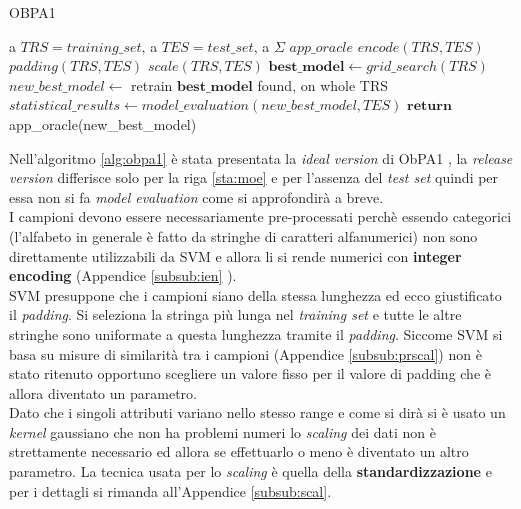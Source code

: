 \begin{algorithm}
\caption{OBPA1}\label{alg:obpa1}
\begin{algorithmic}[1]
\Statex
\Input a $TRS = training\_set$, a $TES = test\_set$, a $\Sigma$   
\Output $app\_oracle$
\State $encode(TRS , TES)$
\State $padding(TRS , TES)$
\State $scale(TRS , TES)$
\State $\textbf{best\_model} \gets grid\_search(TRS)$ \label{sta:quattro}
\State $new\_best\_model \gets$ retrain $\textbf{best\_model}$ found, on whole TRS
\State $statistical\_results \gets model\_evaluation(new\_best\_model,TES)$ \label{sta:moe}
\State $\textbf{return}$ app\_oracle(new\_best\_model) 

   
\end{algorithmic}
\end{algorithm}
Nell'algoritmo \ref{alg:obpa1} è stata presentata la \textit{ideal version} di \ac{ObPA}1 , la \textit{release version} differisce solo per la riga \ref{sta:moe} e per l'assenza del \textit{test set} quindi per essa non si fa \textit{model evaluation} come si approfondirà a breve.\\
I campioni devono essere necessariamente pre-processati perchè essendo categorici (l'alfabeto in generale è fatto da stringhe di caratteri alfanumerici) non sono direttamente utilizzabili da \ac{SVM} e allora li si rende numerici con \textbf{integer encoding} (Appendice \ref{subsub:ien} ).\\
\ac{SVM} presuppone che i campioni siano della stessa lunghezza ed ecco giustificato il \textit{padding}. Si seleziona la stringa più lunga nel \textit{training set} e tutte le altre stringhe sono uniformate a questa lunghezza tramite il \textit{padding}. Siccome \ac{SVM} si basa su misure di similarità tra i campioni (Appendice \ref{subsub:prscal}) non è stato ritenuto opportuno scegliere un valore fisso per il valore di padding che è allora diventato un parametro.\\
Dato che i singoli attributi variano nello stesso range e come si dirà si è usato un \textit{kernel} gaussiano che non ha problemi numeri lo \textit{scaling} dei dati non è strettamente necessario ed allora se effettuarlo o meno è diventato un altro parametro. La tecnica usata per lo \textit{scaling} è quella della \textbf{standardizzazione} e per i dettagli si rimanda all'Appendice \ref{subsub:scal}. 

